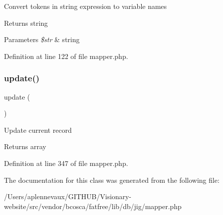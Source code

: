 Convert tokens in string expression to variable names \begin{DoxyReturn}{Returns}
string 
\end{DoxyReturn}

\begin{DoxyParams}{Parameters}
{\em \$str} & string \\
\hline
\end{DoxyParams}


Definition at line 122 of file mapper.\+php.

\hypertarget{class_d_b_1_1_jig_1_1_mapper_a842e4774e3b3601a005b995c02f7e883}{}\label{class_d_b_1_1_jig_1_1_mapper_a842e4774e3b3601a005b995c02f7e883} 
\subsubsection{\texorpdfstring{update()}{update()}}
{\footnotesize\ttfamily update (\begin{DoxyParamCaption}{ }\end{DoxyParamCaption})}

Update current record \begin{DoxyReturn}{Returns}
array 
\end{DoxyReturn}


Definition at line 347 of file mapper.\+php.



The documentation for this class was generated from the following file\+:\begin{DoxyCompactItemize}
\item 
/\+Users/aplennevaux/\+G\+I\+T\+H\+U\+B/\+Visionary-\/website/src/vendor/bcosca/fatfree/lib/db/jig/mapper.\+php\end{DoxyCompactItemize}
